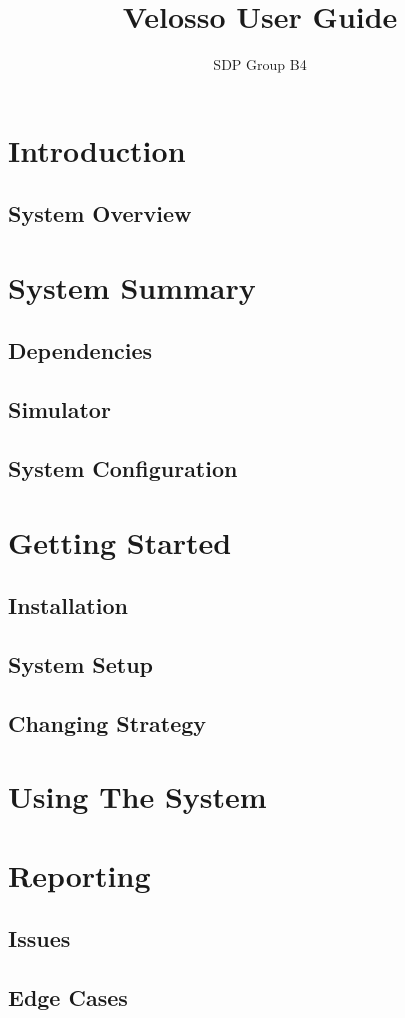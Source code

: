 \documentclass{article}
\title{Velosso User Guide}
\author{SDP Group B4}
\begin{document}
\maketitle



\tableofcontents
 
\section{Introduction}
\subsection{System Overview}

\section{System Summary}
\subsection{Dependencies}
\subsection{Simulator}
\subsection{System Configuration}

\section{Getting Started}
\subsection{Installation}
\subsection{System Setup}
\subsection{Changing Strategy}

\section{Using The System}

\section{Reporting}
 \subsection{Issues}
 \subsection{Edge Cases}
\end{document}
